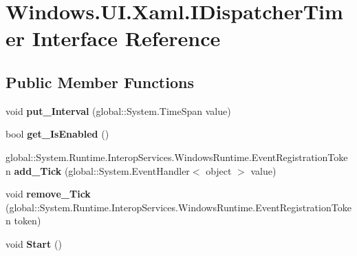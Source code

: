 \hypertarget{interface_windows_1_1_u_i_1_1_xaml_1_1_i_dispatcher_timer}{}\section{Windows.\+U\+I.\+Xaml.\+I\+Dispatcher\+Timer Interface Reference}
\label{interface_windows_1_1_u_i_1_1_xaml_1_1_i_dispatcher_timer}
\subsection*{Public Member Functions}
\begin{DoxyCompactItemize}
\item 
\mbox{\label{interface_windows_1_1_u_i_1_1_xaml_1_1_i_dispatcher_timer_a31cd041ad06e9800dd7028428f45ffce}} 
void {\bfseries put\+\_\+\+Interval} (global\+::\+System.\+Time\+Span value)
\item 
\mbox{\label{interface_windows_1_1_u_i_1_1_xaml_1_1_i_dispatcher_timer_a67b6e2e9a009502e0c91978ec3e1ffc6}} 
bool {\bfseries get\+\_\+\+Is\+Enabled} ()
\item 
\mbox{\label{interface_windows_1_1_u_i_1_1_xaml_1_1_i_dispatcher_timer_a51cc49d4e074524b59fd3824af1b971f}} 
global\+::\+System.\+Runtime.\+Interop\+Services.\+Windows\+Runtime.\+Event\+Registration\+Token {\bfseries add\+\_\+\+Tick} (global\+::\+System.\+Event\+Handler$<$ object $>$ value)
\item 
\mbox{\label{interface_windows_1_1_u_i_1_1_xaml_1_1_i_dispatcher_timer_ad50c6aef1abbae667daedf72bb953263}} 
void {\bfseries remove\+\_\+\+Tick} (global\+::\+System.\+Runtime.\+Interop\+Services.\+Windows\+Runtime.\+Event\+Registration\+Token token)
\item 
\mbox{\label{interface_windows_1_1_u_i_1_1_xaml_1_1_i_dispatcher_timer_a684008a3b69e0e2bdfff696ff246aff6}} 
void {\bfseries Start} ()
\item 
\mbox{\label{interface_windows_1_1_u_i_1_1_xaml_1_1_i_dispatcher_timer_ab54d6b697589bdb58c5d2ae6f4cfafcc}} 

\end{DoxyCompactItemize}
